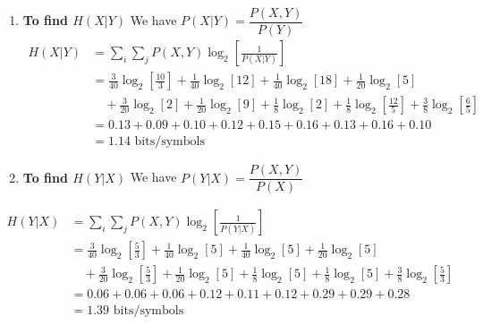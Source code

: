 \documentclass[12pt]{article}
\begin{document}
\begin{enumerate}
	\item[iii.] \textbf{To find $H(X|Y)$}
	      We have $P(X|Y) = \dfrac{P(X,Y)}{P(Y)}$
	      \begin{align*}
		      H(X|Y) & = \sum_i \sum_j P(X,Y) \log_2 \left[ \frac{1}{P(X|Y)} \right]                                                                                                         &  & \\
		             & = \frac{3}{40}\log_2\left[\frac{10}{3}\right] + \frac{1}{40}\log_2[12] + \frac{1}{40}\log_2[18] + \frac{1}{20}\log_2[5]                                               &  & \\
		             & \quad + \frac{3}{20}\log_2[2] + \frac{1}{20}\log_2[9] + \frac{1}{8}\log_2[2] + \frac{1}{8}\log_2\left[\frac{12}{5}\right] + \frac{3}{8}\log_2\left[\frac{6}{5}\right] &  & \\
		             & = 0.13 + 0.09 + 0.10 + 0.12 + 0.15 + 0.16 + 0.13 + 0.16 + 0.10                                                                                                        &  & \\
		             & = 1.14 \text{ bits/symbols}                                                                                                                                           &  &
	      \end{align*}

	\item[iv.] \textbf{To find $H(Y|X)$}
	      We have $P(Y|X) = \dfrac{P(X,Y)}{P(X)}$
\end{enumerate}

\begin{align*}
	H(Y|X) & = \sum_i \sum_j P(X,Y) \log_2 \left[ \frac{1}{P(Y|X)} \right]                                                                                                        &  & \\
	       & = \frac{3}{40}\log_2\left[\frac{5}{3}\right] + \frac{1}{40}\log_2[5] + \frac{1}{40}\log_2[5] + \frac{1}{20}\log_2[5]                                                 &  & \\
	       & \quad + \frac{3}{20}\log_2\left[\frac{5}{3}\right] + \frac{1}{20}\log_2[5] + \frac{1}{8}\log_2[5] + \frac{1}{8}\log_2[5] + \frac{3}{8}\log_2\left[\frac{5}{3}\right] &  & \\
	       & = 0.06 + 0.06 + 0.06 + 0.12 + 0.11 + 0.12 + 0.29 + 0.29 + 0.28                                                                                                       &  & \\
	       & = 1.39 \text{ bits/symbols}                                                                                                                                          &  &
\end{align*}
\end{document}
